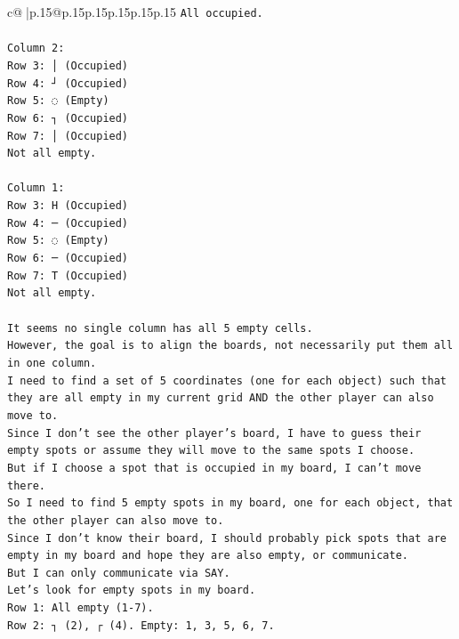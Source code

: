 \documentclass{article}
\begin{document}
{\begin{supertabular}{c@{$\;$}|p{.15\linewidth}@{}p{.15\linewidth}p{.15\linewidth}p{.15\linewidth}p{.15\linewidth}p{.15\linewidth}}
{{{\texttt{All occupied.} \\
\\ 
\texttt{Column 2:} \\
\texttt{Row 3: │ (Occupied)} \\
\texttt{Row 4: ┘ (Occupied)} \\
\texttt{Row 5: ◌ (Empty)} \\
\texttt{Row 6: ┐ (Occupied)} \\
\texttt{Row 7: │ (Occupied)} \\
\texttt{Not all empty.} \\
\\ 
\texttt{Column 1:} \\
\texttt{Row 3: H (Occupied)} \\
\texttt{Row 4: ─ (Occupied)} \\
\texttt{Row 5: ◌ (Empty)} \\
\texttt{Row 6: ─ (Occupied)} \\
\texttt{Row 7: T (Occupied)} \\
\texttt{Not all empty.} \\
\\ 
\texttt{It seems no single column has all 5 empty cells.} \\
\texttt{However, the goal is to align the boards, not necessarily put them all in one column.} \\
\texttt{I need to find a set of 5 coordinates (one for each object) such that they are all empty in my current grid AND the other player can also move to.} \\
\texttt{Since I don't see the other player's board, I have to guess their empty spots or assume they will move to the same spots I choose.} \\
\texttt{But if I choose a spot that is occupied in my board, I can't move there.} \\
\texttt{So I need to find 5 empty spots in my board, one for each object, that the other player can also move to.} \\
\texttt{Since I don't know their board, I should probably pick spots that are empty in my board and hope they are also empty, or communicate.} \\
\texttt{But I can only communicate via SAY.} \\
\texttt{Let's look for empty spots in my board.} \\
\texttt{Row 1: All empty (1{-}7).} \\
\texttt{Row 2: ┐ (2), ┌ (4). Empty: 1, 3, 5, 6, 7.} \\
}}}
\end{supertabular}}
\end{document}
